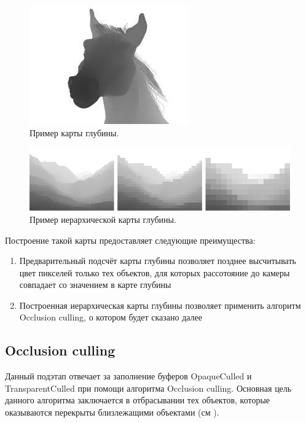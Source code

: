 		\begin{figure}[ht!] 
			\center
			\includegraphics [scale=1] {my_folder/images//depth_map}	
			\caption{Пример карты глубины.} 
			\label{fig:depth_map}
		\end{figure}
		
		\begin{figure}[ht!] 
			\center
			\includegraphics [scale=1] {my_folder/images//hier_depth_map}	
			\caption{Пример иерархической карты глубины.} 
			\label{fig:hier_depth_map}
		\end{figure}
		\FloatBarrier
		Построение такой карты предоставляет следующие преимущества:
		\begin{enumerate}[1.]
			\item Предварительный подсчёт карты глубины позволяет позднее высчитывать цвет пикселей только тех объектов, для которых рассотояние до камеры совпадает со значением в карте глубины
			\item Построенная иерархическая карты глубины позволяет применить алгоритм Occlusion culling, о котором будет сказано далее
		\end{enumerate}
	\subsection{Occlusion culling} \label{ch3:pre_pass:occlusion}
		Данный подэтап отвечает за заполнение буферов OpaqueCulled и  TransparentCulled при помощи алгоритма Occlusion culling. Основная цель данного алгоритма заключается в отбрасывании тех объектов, которые оказываются перекрыты близлежащими объектами (см ). 
		
